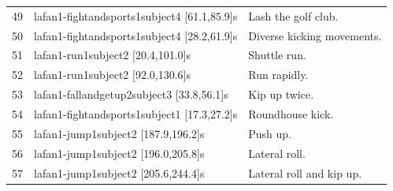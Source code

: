 \begin{table}[htbp]
\begin{tabularx}{\textwidth}{llX}
    49 & \ac{lafan1}-fightandsports1subject4 [61.1,85.9]s & Lash the golf club. \\
    50 & \ac{lafan1}-fightandsports1subject4 [28.2,61.9]s & Diverse kicking movements. \\
    51 & \ac{lafan1}-run1subject2 [20.4,101.0]s & Shuttle run. \\
    52 & \ac{lafan1}-run1subject2 [92.0,130.6]s & Run rapidly. \\
    53 & \ac{lafan1}-fallandgetup2subject3 [33.8,56.1]s & Kip up twice. \\
    54 & \ac{lafan1}-fightandsports1subject1 [17.3,27.2]s & Roundhouse kick. \\
    55 & \ac{lafan1}-jump1subject2 [187.9,196.2]s & Push up. \\
    56 & \ac{lafan1}-jump1subject2 [196.0,205.8]s & Lateral roll. \\
    57 & \ac{lafan1}-jump1subject2 [205.6,244.4]s & Lateral roll and kip up. \\
    \bottomrule
  \end{tabularx}
\end{table}